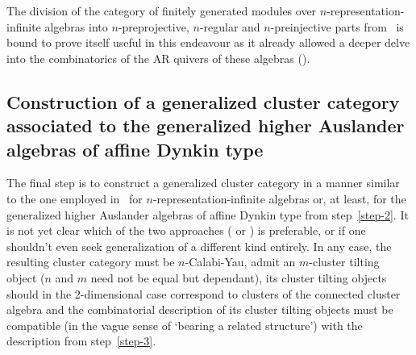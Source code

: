 \documentclass[a4paper,oneside,svgnames]{amsart}
\theoremstyle{plain}
\theoremstyle{definition}
\begin{document}
 The division of the category of finitely generated modules over
 $n$-representation-infinite algebras into $n$-preprojective, $n$-regular and
 $n$-preinjective parts from~\cite[Theorem 4.18]{hio} is bound to prove itself
 useful in this endeavour as it already allowed a deeper delve into the
 combinatorics of the AR quivers of these algebras (\cite{gll}).

 \subsection{Construction of a generalized cluster category associated to the
 generalized higher Auslander algebras of affine Dynkin type}

 The final step is to construct a generalized cluster category in a manner
 similar to the one employed in~\cite[Section~5]{ot} for
 $n$-representation-infinite algebras or, at least, for the generalized higher
 Auslander algebras of affine Dynkin type from step~\ref{step-2}. It is not yet
 clear which of the two approaches (\cite{amiot1} or \cite{guo}) is preferable,
 or if one shouldn't even seek generalization of a different kind entirely. In
 any case, the resulting cluster category must be $n$-Calabi-Yau, admit an
 $m$-cluster tilting object ($n$ and $m$ need not be equal but dependant), its
 cluster tilting objects should in the 2-dimensional case correspond to clusters
 of the connected cluster algebra and the combinatorial description of its
 cluster tilting objects must be compatible (in the vague sense of `bearing a
 related structure') with the description from step~\ref{step-3}.
\end{document}
